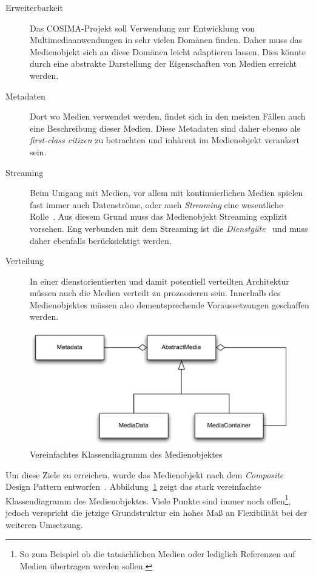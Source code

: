   \begin{description}
    \item[Erweiterbarkeit] Das COSIMA-Projekt soll Verwendung zur Entwicklung von Multimediaanwendungen in sehr vielen Domänen finden. Daher muss das Medienobjekt sich an diese Domänen leicht adaptieren lassen. Dies könnte durch eine abstrakte Darstellung der Eigenschaften von Medien erreicht werden.
    \item[Metadaten] Dort wo Medien verwendet werden, findet sich in den meisten Fällen auch eine Beschreibung dieser Medien. Diese Metadaten sind daher ebenso als \emph{first-class citizen} zu betrachten und inhärent im Medienobjekt verankert sein.
    \item[Streaming] Beim Umgang mit Medien, vor allem mit kontinuierlichen Medien spielen fast immer auch Datenströme, oder auch \emph{Streaming} eine wesentliche Rolle~\citep[S. 14ff]{multimedia_technologie}. Aus diesem Grund muss das Medienobjekt Streaming explizit vorsehen. Eng verbunden mit dem Streaming ist die \emph{Dienstgüte}~\citep{multimedia_technologie} und muss daher ebenfalls berücksichtigt werden.
    \item[Verteilung] In einer dienstorientierten und damit potentiell verteilten Architektur müssen auch die Medien verteilt zu prozessieren sein. Innerhalb des Medienobjektes müssen also dementsprechende Voraussetzungen geschaffen werden.
  \end{description}

\begin{figure}[ht]
  \centering
    \includegraphics[width=.9\textwidth]{images/Medienobjekt.pdf}
  \caption{Vereinfachtes Klassendiagramm des Medienobjektes}
  \label{fig:medienobjekt}
\end{figure}

  Um diese Ziele zu erreichen, wurde das Medienobjekt nach dem \emph{Composite} Design Pattern entworfen~\citep[S. 163]{design_patterns}. Abbildung~\ref{fig:medienobjekt} zeigt das stark vereinfachte Klassendiagramm des Medienobjektes. Viele Punkte sind immer noch offen\footnote{So zum Beispiel ob die tatsächlichen Medien oder lediglich Referenzen auf Medien übertragen werden sollen.}, jedoch verspricht die jetzige Grundstruktur ein hohes Maß an Flexibilität bei der weiteren Umsetzung.
  

